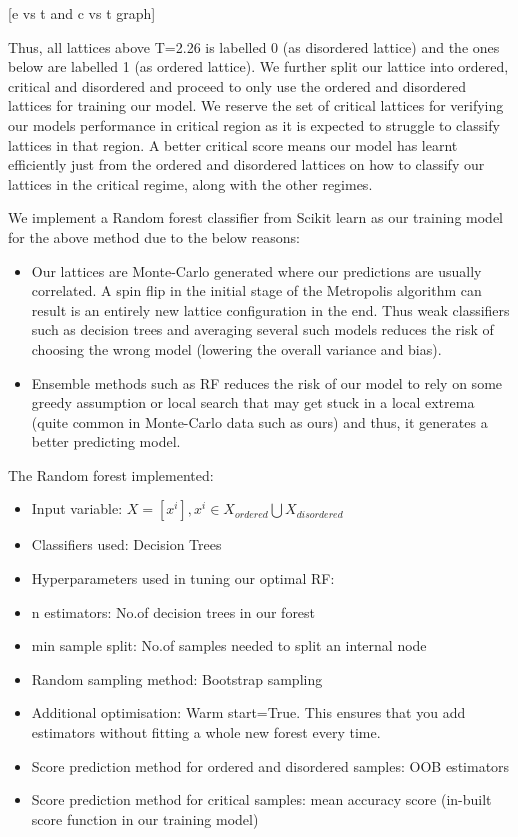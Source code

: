 [e vs t and c vs t graph]

Thus, all lattices above T=2.26 is labelled 0 (as disordered lattice) and the ones below are labelled 1 (as ordered lattice). We further split our lattice into ordered, critical and disordered and proceed to only use the ordered and disordered lattices for training our model. We reserve the set of critical lattices for verifying our models performance in critical region as it is expected to struggle to classify lattices in that region. A better critical score means our model has learnt efficiently just from the ordered and disordered lattices on how to classify our lattices in the critical regime, along with the other regimes.

We implement a Random forest classifier from Scikit learn as our training model for the above method due to the below reasons:
\begin{itemize}
    \item Our lattices are Monte-Carlo generated where our predictions are usually correlated. A spin flip in the initial stage of the Metropolis algorithm can result is an entirely new lattice configuration in the end. Thus weak classifiers such as decision trees and averaging several such models reduces the risk of choosing the wrong model (lowering the overall variance and bias).
    \item Ensemble methods such as RF reduces the risk of our model to rely on some greedy assumption or local search that may get stuck in a local extrema (quite common in Monte-Carlo data such as ours) and thus, it generates a better predicting model.
\end{itemize}

The Random forest implemented:
\begin{itemize}
    \item Input variable: \(X=[x^i],x^i\in {X_{ordered}\bigcup X_{disordered}}\)
    \item Classifiers used: Decision Trees
    \item Hyperparameters used in tuning our optimal RF:
        \item n estimators: No.of decision trees in our forest
        \item min sample split: No.of samples needed to split an internal node
    \item Random sampling method: Bootstrap sampling
    \item Additional optimisation: Warm start=True. This ensures that you add estimators without fitting a whole new forest every time.
    \item Score prediction method for ordered and disordered samples: OOB estimators 
    \item Score prediction method for critical samples: mean accuracy score (in-built score function in our training model)
\end{itemize}

